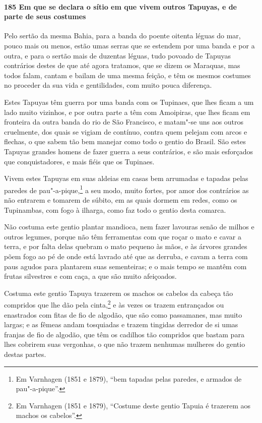 \paragraph{185 Em que se declara o sítio em que vivem outros Tapuyas, e de parte de seus
costumes}

Pelo sertão da mesma Bahia, para a banda do poente oitenta léguas do mar, pouco mais ou
menos, estão umas serras que se estendem por uma banda e por a outra, e para o sertão mais
de duzentas léguas, tudo povoado de Tapuyas contrários destes de que até agora tratamos,
que se dizem os Maraquas, mas todos falam, cantam e bailam de uma mesma feição, e têm os
mesmos costumes no proceder da sua vida e gentilidades, com muito pouca diferença.

Estes Tapuyas têm guerra por uma banda com os Tupinaes, que lhes ficam a um lado muito
vizinhos, e por outra parte a têm com Amoipiras, que lhes ficam em fronteira da outra
banda do rio de São Francisco, e matam"-se uns aos outros cruelmente, dos quais se vigiam
de contínuo, contra quem pelejam com arcos e flechas, o que sabem tão bem manejar como
todo o gentio do Brasil. São estes Tapuyas grandes homens de fazer guerra a seus
contrários, e são mais esforçados que conquistadores, e mais fiéis que os Tupinaes.

Vivem estes Tapuyas em suas aldeias em casas bem arrumadas e tapadas pelas paredes de
pau"-a-pique,\footnote{ Em Varnhagen (1851 e 1879), ``bem tapadas pelas paredes, e armados
de pau"-a-pique''.} a seu modo, muito fortes, por amor dos contrários as não entrarem e
tomarem de súbito, em as quais dormem em redes, como os Tupinambas, com fogo à ilharga,
como faz todo o gentio desta comarca.

Não costuma este gentio plantar mandioca, nem fazer lavouras senão de milhos e outros
legumes, porque não têm ferramentas com que roçar o mato e cavar a terra, e por falta
delas quebram o mato pequeno às mãos, e às árvores grandes põem fogo ao pé de onde está
lavrado até que as derruba, e cavam a terra com paus agudos para plantarem suas
sementeiras; e o mais tempo se mantêm com frutas silvestres e com caça, a que são muito
afeiçoados.

Costuma este gentio Tapuya trazerem os machos os cabelos da cabeça tão compridos que lhe
dão pela cinta,\footnote{ Em Varnhagen (1851 e 1879), ``Costume deste gentio Tapuia é
trazerem aos machos os cabelos''.} e às vezes os trazem entrançados ou enastrados com
fitas de fio de algodão, que são como passamanes, mas muito largas; e as fêmeas andam
tosquiadas e trazem tingidas derredor de si umas franjas de fio de algodão, que têm os
cadilhos tão compridos que bastam para lhes cobrirem suas vergonhas, o que não trazem
nenhumas mulheres do gentio destas partes.

